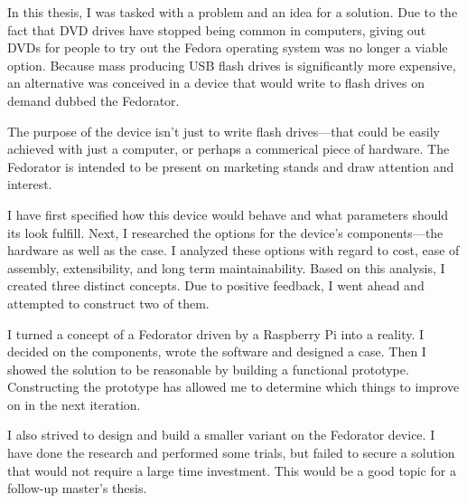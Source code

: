 \label{Conclusion}
        
        In this thesis, I was tasked with a problem and an idea for a solution.  Due to the fact that DVD drives have stopped being common in computers, giving out DVDs for people to try out the Fedora operating system was no longer a viable option.  Because mass producing USB flash drives is significantly more expensive, an alternative was conceived in a device that would write to flash drives on demand dubbed the Fedorator.
        
        The purpose of the device isn't just to write flash drives—that could be easily achieved with just a computer, or perhaps a commerical piece of hardware.  The Fedorator is intended to be present on marketing stands and draw attention and interest.
        
        I have first specified how this device would behave and what parameters should its look fulfill.  Next, I researched the options for the device's components—the hardware as well as the case.  I analyzed these options with regard to cost, ease of assembly, extensibility, and long term maintainability.  Based on this analysis, I created three distinct concepts.  Due to positive feedback, I went ahead and attempted to construct two of them.
        
        I turned a concept of a Fedorator driven by a Raspberry Pi into a reality.  I decided on the components, wrote the software and designed a case.  Then I showed the solution to be reasonable by building a functional prototype.  Constructing the prototype has allowed me to determine which things to improve on in the next iteration.
        
        I also strived to design and build a smaller variant on the Fedorator device.  I have done the research and performed some trials, but failed to secure a solution that would not require a large time investment.  This would be a good topic for a follow-up master's thesis. %
        
